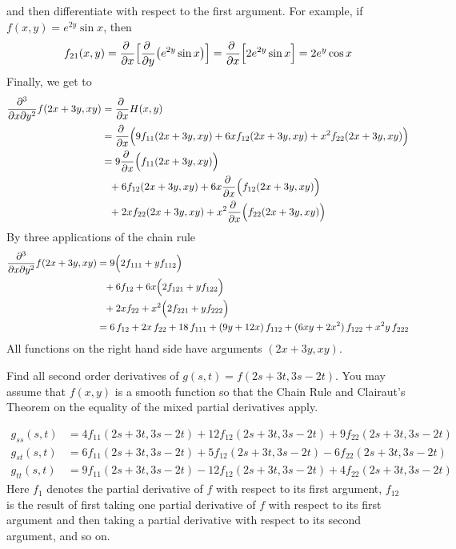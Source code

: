 \begin{solution}
and then differentiate with respect to the first argument. For example,
if $f(x,y)=e^{2y}\sin x$, then
\begin{align*}
f_{21}(x,y)
=\pdiff{}{x}
   \Big[\pdiff{}{y}\big(e^{2y}\sin x\big)\Big]
=\pdiff{}{x}
   \Big[2e^{2y}\sin x\Big]
=2e^y\cos x
\end{align*}
Finally, we get to 
\begin{align*}
\frac{\partial^3}{\partial x\partial y^2}f(2x+3y,xy)
&=\pdiff{}{x} H(x,y) \\
&=\pdiff{}{x}\Big(9f_{11}(2x+3y,xy)+6xf_{12}(2x+3y,xy)+x^2f_{22}(2x+3y,xy)\Big)\\
&=9\pdiff{}{x}\Big(f_{11}(2x+3y,xy)\Big)\\&\hskip0.1in 
  +6f_{12}(2x+3y,xy) +6x\pdiff{}{x}\Big(f_{12}(2x+3y,xy)\Big) \\&\hskip0.1in
  +2xf_{22}(2x+3y,xy)
  +x^2\pdiff{}{x}\Big(f_{22}(2x+3y,xy)\Big)
\end{align*}
By three applications of the chain rule
\begin{align*}
\frac{\partial^3}{\partial x\partial y^2}f(2x+3y,xy)
&=9\Big(2f_{111}+yf_{112}\Big)\\&\hskip0.1in
+6f_{12}+6x\Big(2f_{121}+yf_{122}\Big)\\&\hskip0.1in
+2xf_{22}+x^2\Big(2f_{221}+yf_{222}\Big)\\
&=6\,f_{12}+2x\,f_{22}+18\,f_{111}+(9y+12x)\,f_{112}
+(6xy+2x^2)\,f_{122}+x^2y\,f_{222}
\end{align*}
All functions on the right hand side have arguments $(2x+3y,xy)$.

\end{solution}



\begin{question}
 Find all second order derivatives of $g(s,t)=f(2s+3t,3s-2t)$.
You may assume that $f(x,y)$ is a smooth function so that the 
Chain Rule and Clairaut's Theorem on the equality of the mixed partial derivatives apply.
\end{question}


\begin{answer}
\begin{align*}
g_{ss}(s,t)&=4f_{11}(2s+3t,3s-2t)+12f_{12}(2s+3t,3s-2t)+9f_{22}(2s+3t,3s-2t)\\
g_{st}(s,t)&=6f_{11}(2s+3t,3s-2t)+5f_{12}(2s+3t,3s-2t)-6f_{22}(2s+3t,3s-2t)\\
g_{tt}(s,t)&=9f_{11}(2s+3t,3s-2t)-12f_{12}(2s+3t,3s-2t)+4f_{22}(2s+3t,3s-2t)
\end{align*}
Here $f_1$ denotes the partial derivative of $f$ with respect to its first
argument, $f_{12}$ is the result of first taking one partial derivative
of $f$ with respect to its first argument and then taking a partial derivative
with respect to its second argument, and so on.
\end{answer}

